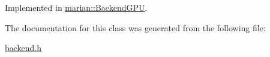 Implemented in \hyperlink{classmarian_1_1BackendGPU_adf0609049c6b7cea424fee23f789bc52}{marian\+::\+Backend\+G\+PU}.



The documentation for this class was generated from the following file\+:\begin{DoxyCompactItemize}
\item 
\hyperlink{backend_8h}{backend.\+h}\end{DoxyCompactItemize}
